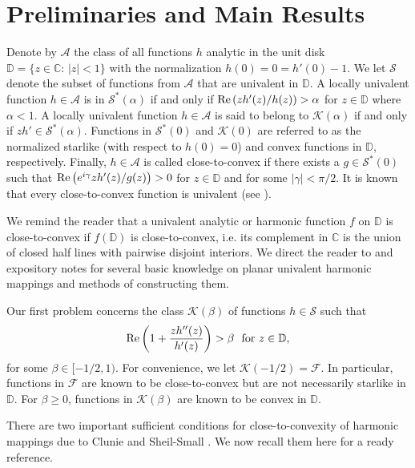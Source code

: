 \documentclass[a4paper,12pt]{amsart}
\theoremstyle{definition}
\newcounter {own}
\begin{document}
\section{Preliminaries and Main Results}
Denote by ${\mathcal A}$ the class of all functions $h$ analytic in the unit disk ${\mathbb D}=\{z \in {\mathbb C}:\, |z|<1\}$
with the normalization $h(0)=0=h'(0)-1$. We let $\mathcal S$ denote the subset of
functions from ${\mathcal A}$ that are univalent in ${{\mathbb D}}$.
A locally univalent function $h\in {\mathcal A}$ is in ${\mathcal S}^*(\alpha)$ if and only
if $ {\rm Re } \left(zh'(z)/h(z)\right) > \alpha$ for $z\in {{\mathbb D}}$ where $\alpha <1$. A locally univalent function
$h\in {\mathcal A}$ is said to belong to ${\mathcal K}(\alpha)$ if and only if $zh' \in {\mathcal S}^*(\alpha)$. Functions in ${\mathcal S}^*(0)$
and ${\mathcal K}(0)$ are referred to as the normalized starlike (with respect to $h(0)=0$) and convex functions in ${{\mathbb D}}$, respectively.
Finally, $h\in {\mathcal A}$ is called close-to-convex if there exists a $g\in {\mathcal S}^*(0)$ such that
$ {\rm Re } \left(e^{i\gamma}zh'(z)/g(z)\right) > 0$ for $z\in {{\mathbb D}}$ and for some $|\gamma |<\pi/2$.
It is known that every close-to-convex function is univalent (see \cite{Dur,Pomm}).

We remind the reader that a univalent analytic or harmonic function $f$ on ${{\mathbb D}}$ is close-to-convex if $f({{\mathbb D}})$ is close-to-convex, i.e.
its complement in ${{\mathbb C}}$ is the union of closed half lines with pairwise disjoint interiors. We direct the reader
to \cite{Clunie-Small-84,Du} and expository notes \cite{SaRa2013} for several basic knowledge on planar univalent harmonic mappings
and methods of constructing them.

Our first problem concerns the class $ \mathcal{K}(\beta)$ of functions $h\in {\mathcal S}$ such that
\begin{equation}\label{class-G}
{\rm Re } \left( 1+\frac{zh''(z)}{h'(z)}\right) > \beta ~\mbox{ for $z\in {{\mathbb D}}$},
\end{equation}
for some $\beta \in [-1/2,1)$. For convenience, we let $ {\mathcal K}(-1/2)=\mathcal{F}$.
In particular, functions in $\mathcal{F}$ are known to be close-to-convex but are not
necessarily starlike in ${{\mathbb D}}$. For $\beta \geq 0$, functions in $\mathcal{K}(\beta)$ are known to be convex
in ${{\mathbb D}}$.

There are two important sufficient conditions for close-to-convexity of harmonic
mappings due to Clunie and Sheil-Small \cite{Clunie-Small-84}. We now recall them here for a ready
reference.
\end{document}
